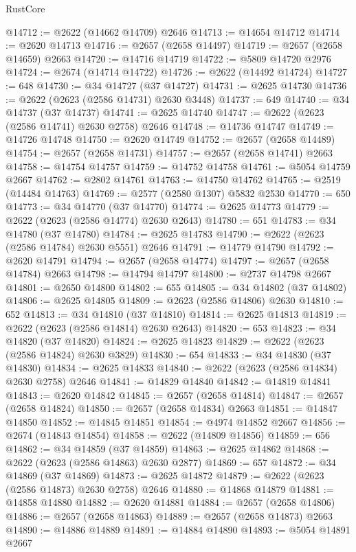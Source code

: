 \begin{lexlean}{RustCore}
\begin{coremodule}
@14712 := @2622 (@14662 @14709) @2646
@14713 := @14654 @14712
@14714 := @2620 @14713
@14716 := @2657 (@2658 @14497)
@14719 := @2657 (@2658 @14659) @2663
@14720 := @14716 @14719
@14722 := @5809 @14720 @2976
@14724 := @2674 (@14714 @14722)
@14726 := @2622 (@14492 @14724)
@14727 := 648
@14730 := @34 @14727 (@37 @14727)
@14731 := @2625 @14730
@14736 := @2622 (@2623 (@2586 @14731) @2630 @3448)
@14737 := 649
@14740 := @34 @14737 (@37 @14737)
@14741 := @2625 @14740
@14747 := @2622 (@2623 (@2586 @14741) @2630 @2758) @2646
@14748 := @14736 @14747
@14749 := @14726 @14748
@14750 := @2620 @14749
@14752 := @2657 (@2658 @14489)
@14754 := @2657 (@2658 @14731)
@14757 := @2657 (@2658 @14741) @2663
@14758 := @14754 @14757
@14759 := @14752 @14758
@14761 := @5054 @14759 @2667
@14762 := @2802 @14761
@14763 := @14750 @14762
@14765 := @2519 (@14484 @14763)
@14769 := @2577 (@2580 @1307) @5832 @2530
@14770 := 650
@14773 := @34 @14770 (@37 @14770)
@14774 := @2625 @14773
@14779 := @2622 (@2623 (@2586 @14774) @2630 @2643)
@14780 := 651
@14783 := @34 @14780 (@37 @14780)
@14784 := @2625 @14783
@14790 := @2622 (@2623 (@2586 @14784) @2630 @5551) @2646
@14791 := @14779 @14790
@14792 := @2620 @14791
@14794 := @2657 (@2658 @14774)
@14797 := @2657 (@2658 @14784) @2663
@14798 := @14794 @14797
@14800 := @2737 @14798 @2667
@14801 := @2650 @14800
@14802 := 655
@14805 := @34 @14802 (@37 @14802)
@14806 := @2625 @14805
@14809 := @2623 (@2586 @14806) @2630
@14810 := 652
@14813 := @34 @14810 (@37 @14810)
@14814 := @2625 @14813
@14819 := @2622 (@2623 (@2586 @14814) @2630 @2643)
@14820 := 653
@14823 := @34 @14820 (@37 @14820)
@14824 := @2625 @14823
@14829 := @2622 (@2623 (@2586 @14824) @2630 @3829)
@14830 := 654
@14833 := @34 @14830 (@37 @14830)
@14834 := @2625 @14833
@14840 := @2622 (@2623 (@2586 @14834) @2630 @2758) @2646
@14841 := @14829 @14840
@14842 := @14819 @14841
@14843 := @2620 @14842
@14845 := @2657 (@2658 @14814)
@14847 := @2657 (@2658 @14824)
@14850 := @2657 (@2658 @14834) @2663
@14851 := @14847 @14850
@14852 := @14845 @14851
@14854 := @4974 @14852 @2667
@14856 := @2674 (@14843 @14854)
@14858 := @2622 (@14809 @14856)
@14859 := 656
@14862 := @34 @14859 (@37 @14859)
@14863 := @2625 @14862
@14868 := @2622 (@2623 (@2586 @14863) @2630 @2877)
@14869 := 657
@14872 := @34 @14869 (@37 @14869)
@14873 := @2625 @14872
@14879 := @2622 (@2623 (@2586 @14873) @2630 @2758) @2646
@14880 := @14868 @14879
@14881 := @14858 @14880
@14882 := @2620 @14881
@14884 := @2657 (@2658 @14806)
@14886 := @2657 (@2658 @14863)
@14889 := @2657 (@2658 @14873) @2663
@14890 := @14886 @14889
@14891 := @14884 @14890
@14893 := @5054 @14891 @2667

\end{coremodule}
\end{lexlean}
